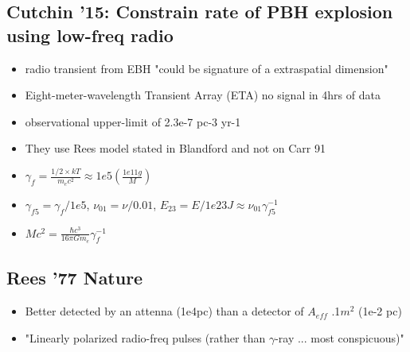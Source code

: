 \documentclass[12pt]{article}
\newenvironment{tightemize}{\vspace{-\topsep}\begin{itemize}\itemsep1pt \parskip0pt \parsep0pt}{\end{itemize}\vspace{-\topsep}}
\begin{document}
\subsection{Cutchin '15: Constrain rate of PBH explosion using low-freq radio}
\begin{tightemize}
    \item radio transient from EBH "could be signature of a extraspatial dimension"
    \item Eight-meter-wavelength Transient Array (ETA) no signal in 4hrs of data
    \item observational upper-limit of 2.3e-7 pc-3 yr-1 
    \item They use Rees model stated in Blandford and not on Carr 91
    \item $\gamma_f = \frac{1/2\times kT}{m_ec^2} \approx 1e5 (\frac{1e11g}{M})$
    \item $\gamma_{f5} = \gamma_f/1e5$, $\nu_{01} = \nu/0.01$, $E_{23} = E/1e23 J \approx \nu_{01}\gamma_{f5}^{-1}$
    \item $Mc^2 = \frac{\hbar c^3}{16\pi Gm_e}\gamma_f^{-1}$
\end{tightemize}

\subsection{Rees '77 Nature}
\begin{itemize}
    \item Better detected by an attenna (1e4pc) than a detector of $A_{eff}$ .1$m^2$ (1e-2 pc)
    \item "Linearly polarized radio-freq pulses (rather than $\gamma$-ray ... most conspicuous)"
\end{itemize}
\end{document}
